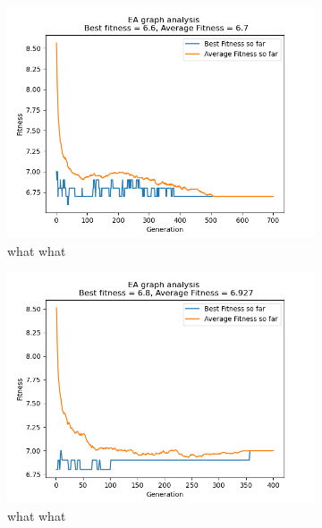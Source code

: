 \documentclass[conference,compsoc]{IEEEtran}
\begin{document}
\begin{figure}\ContinuedFloat
  \centering
  \begin{subfigure}{0.34\textwidth}
    \includegraphics[width=\linewidth]{../Results/_11_RBS_Truncation_100_50_700.png}
    \caption{what what}
  \end{subfigure}
  \begin{subfigure}{0.34\textwidth}
    \includegraphics[width=\linewidth]{../Results/_11_Truncation_Truncation_100_50_400.png}
    \caption{what what}
  \end{subfigure}
  \begin{subfigure}{0.34\textwidth}

\end{subfigure}
\end{figure}
\end{document}
